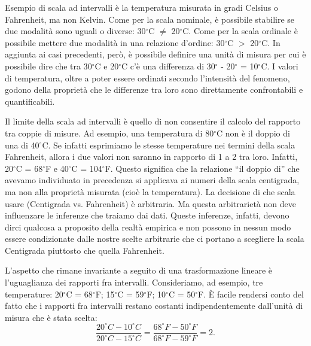 Esempio di scala ad intervalli è la temperatura misurata in gradi Celsius o Fahrenheit, ma non Kelvin. 
Come per la scala nominale, è possibile stabilire se due modalità sono uguali o diverse: 30$^\circ$C $\neq$ 20$^\circ$C. 
Come per la scala ordinale è possibile mettere due modalità in una relazione d'ordine: 30$^\circ$C $>$ 20$^\circ$C. 
In aggiunta ai casi precedenti, però, è possibile definire una unità di misura per cui è possibile dire che tra 30$^\circ$C e 20$^\circ$C c'è una differenza di 30$^\circ$ - 20$^\circ$ = 10$^\circ$C. 
I valori di temperatura, oltre a poter essere ordinati secondo l'intensità del fenomeno, godono della proprietà che le differenze tra loro sono direttamente confrontabili e quantificabili.  

Il limite della scala ad intervalli è quello di non consentire il calcolo del rapporto tra coppie di misure. 
Ad esempio, una temperatura di 80$^\circ$C non è il doppio di una di 40$^\circ$C.  
Se infatti esprimiamo le stesse temperature nei termini della scala Fahrenheit, allora i due valori non saranno in rapporto di 1 a 2 tra loro. Infatti, 20$^\circ$C = 68$^\circ$F e 40$^\circ$C = 104$^\circ$F. Questo significa che la relazione ``il doppio di'' che avevamo individuato in precedenza si applicava ai numeri della scala centigrada, ma non alla proprietà misurata (cioè la temperatura). 
La decisione di che scala usare (Centigrada vs. Fahrenheit) è arbitraria.  
Ma questa arbitrarietà non deve influenzare le inferenze che traiamo dai dati. 
Queste inferenze, infatti, devono dirci qualcosa a proposito della realtà empirica e non possono in nessun modo essere condizionate dalle nostre scelte arbitrarie che ci portano a scegliere la scala Centigrada piuttosto che quella Fahrenheit.

L'aspetto che rimane invariante a seguito di una trasformazione lineare è l'uguaglianza dei rapporti fra intervalli. Consideriamo, ad esempio, tre temperature: 20$^\circ$C = 68$^\circ$F; 15$^\circ$C = 59$^\circ$F; 10$^\circ$C = 50$^\circ$F. È facile rendersi conto del fatto che i rapporti fra intervalli restano costanti indipendentemente dall'unità di misura che è stata scelta:
\[
\frac{20^\circ C - 10^\circ C}{20^\circ C - 15^\circ C} = 
\frac{68^\circ F - 50^\circ F}{68^\circ F-59^\circ F} = 2.
\]

